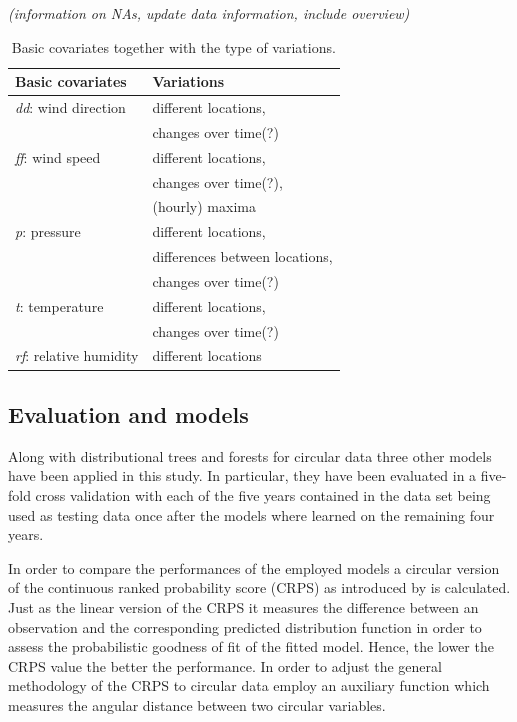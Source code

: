 \documentclass[nojss]{jss}
\newcommand{\fixme}[1]{\emph{\marginpar{FIXME} (#1)}}
\numberwithin{equation}{section}
\begin{document}
\fixme{information on NAs, update data information, include overview}


\begin{table}[t!]
\begin{minipage}{\textwidth}
\caption[Table caption text]{Basic covariates together with the type of variations.}
\label{tab:covariates}
\begin{tabular}{l  l}
\hline
Basic covariates & Variations\\
\hline
\emph{dd}: wind direction       & different locations, \\
                                & changes over time(?)\\
\emph{ff}: wind speed           & different locations, \\
                                & changes over time(?), \\
                                & (hourly) maxima\\
\emph{p}: pressure              & different locations, \\
                                & differences between locations, \\
                                & changes over time(?)\\
\emph{t}: temperature           & different locations, \\
                                & changes over time(?)\\
\emph{rf}: relative humidity    & different locations\\
\hline
\end{tabular}
\end{minipage} 
\end{table}



\subsection{Evaluation and models}
Along with distributional trees and forests for circular data three other models have been applied
in this study. In particular, they have been evaluated in a five-fold cross validation with each of 
the five years contained in the data set being used as testing data once after the models where 
learned on the remaining four years. 

In order to compare the performances of the employed models a circular version of the continuous 
ranked probability score (CRPS) as introduced by \cite{Grimit+Gneiting+Berrocal:2006} is calculated.
Just as the linear version of the CRPS \citep[for more details see][]{Hersbach:2000} it measures the 
difference between an observation and the corresponding predicted distribution function in order 
to assess the probabilistic goodness of fit of the fitted model. Hence, the lower the CRPS value 
the better the performance. In order to adjust the general methodology of the CRPS to circular data 
\cite{Grimit+Gneiting+Berrocal:2006} employ an auxiliary function which measures the angular distance 
between two circular variables. 
\end{document}
